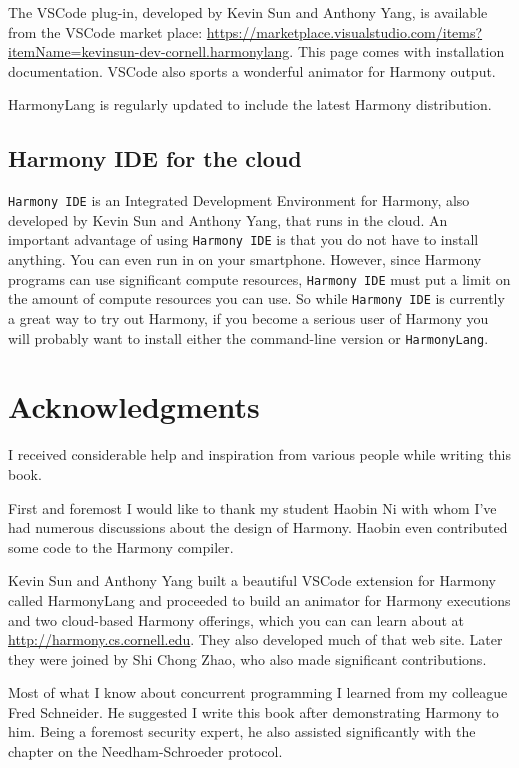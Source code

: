 \documentclass{report}
\begin{document}
The VSCode plug-in, developed by Kevin Sun and Anthony Yang,
is available from the VSCode market place: \url{https://marketplace.visualstudio.com/items?itemName=kevinsun-dev-cornell.harmonylang}.
This page comes with installation documentation.  VSCode also sports a
wonderful animator for Harmony output.

HarmonyLang is regularly updated to include the latest Harmony distribution.

\section{Harmony IDE for the cloud}

\texttt{Harmony IDE} is an Integrated Development Environment for Harmony,
also developed by Kevin Sun and Anthony Yang,
that runs in the cloud.  An important advantage of using \texttt{Harmony IDE}
is that you do not have to install anything.  You can even run in on your
smartphone.  However, since Harmony programs can use significant compute
resources, \texttt{Harmony IDE} must put a limit on the amount of compute
resources you can use.  So while \texttt{Harmony IDE} is currently a great
way to try out Harmony, if you become a serious user of Harmony you
will probably want to install either the command-line version or
\texttt{HarmonyLang}.

\cleardoublepage
{}
{}
\chapter*{Acknowledgments}

I received considerable help and inspiration from various people
while writing this book.

First and foremost I would like to thank my student Haobin Ni with
whom I've had numerous discussions about the design of Harmony.
Haobin even contributed some code to the Harmony compiler.

Kevin Sun and Anthony Yang built a beautiful VSCode extension for Harmony
called HarmonyLang and proceeded to build an animator for Harmony
executions and two cloud-based Harmony offerings, which you can can learn
about at \url{http://harmony.cs.cornell.edu}.  They also developed much of
that web site.  Later they were joined by Shi Chong Zhao, who also
made significant contributions.

Most of what I know about concurrent programming I learned from
my colleague Fred Schneider.  He suggested I write this book after
demonstrating Harmony to him.  Being a foremost security expert, he also
assisted significantly with the chapter on the Needham-Schroeder protocol.
\end{document}
